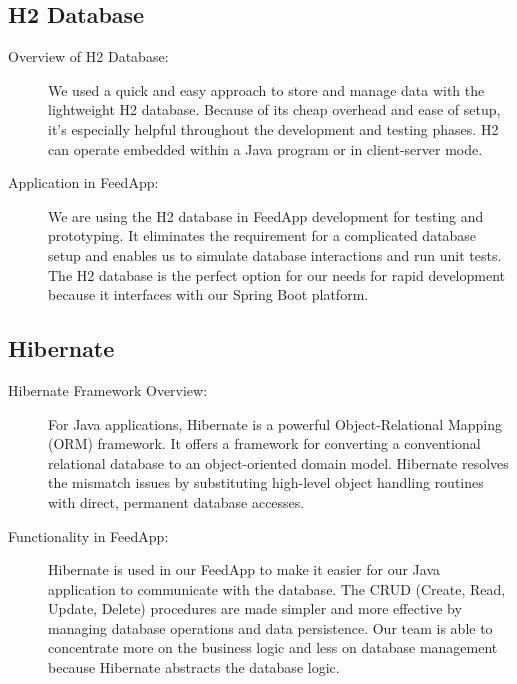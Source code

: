 \subsection{H2 Database}
\begin{description}
 \item[Overview of H2 Database:]
We used a quick and easy approach to store and manage data with the lightweight H2 database. Because of its cheap overhead and ease of setup, it's especially helpful throughout the development and testing phases. H2 can operate embedded within a Java program or in client-server mode.

 \item[Application in FeedApp:]
We are using the H2 database in FeedApp development for testing and prototyping. It eliminates the requirement for a complicated database setup and enables us to simulate database interactions and run unit tests. The H2 database is the perfect option for our needs for rapid development because it interfaces with our Spring Boot platform.
\end{description}

\subsection{Hibernate}
\begin{description}
 \item[Hibernate Framework Overview:]
For Java applications, Hibernate is a powerful Object-Relational Mapping (ORM) framework. It offers a framework for converting a conventional relational database to an object-oriented domain model. Hibernate resolves the mismatch issues by substituting high-level object handling routines with direct, permanent database accesses.

 \item[Functionality in FeedApp:]
Hibernate is used in our FeedApp to make it easier for our Java application to communicate with the database. The CRUD (Create, Read, Update, Delete) procedures are made simpler and more effective by managing database operations and data persistence. Our team is able to concentrate more on the business logic and less on database management because Hibernate abstracts the database logic.
\end{description}

